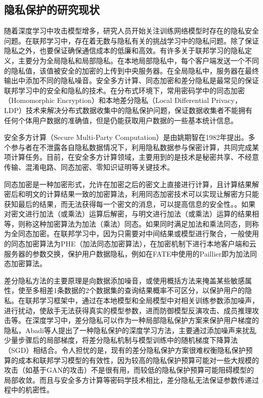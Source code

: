 \subsection{隐私保护的研究现状}
随着深度学习中攻击模型增多，研究人员开始关注训练网络模型时存在的隐私安全问题。在联邦学习中，存在着无数与隐私有关的挑战学习中的隐私问题。除了保证隐私之外，也要保证确保通信成本的低廉和高效。有许多关于联邦学习的隐私定义，主要分为全局隐私和局部隐私。在本地局部隐私中，每个客户端发送一个不同的隐私值，该值被安全的加密的上传到中央服务器。在全局隐私中，服务器在最终输出中添加不同的隐私噪音。安全多方计算、同态加密和差分隐私是最常见的保证联邦学习中的安全和隐私的技术。在分布式环境下，常用密码学中的同态加密（Homomorphic Encryption）和本地差分隐私（Local Differential Privacy， LDP）技术来解决分布式数据收集中的隐私保护问题，保证数据收集者不能拥有任何个体用户数据的准确值，但是仍能获取用户数据的一些基本统计信息。

安全多方计算（Secure Multi-Party Computation）是由姚期智在1982年提出。多个参与者在不泄露各自隐私数据情况下，利用隐私数据参与保密计算，共同完成某项计算任务。目前，在安全多方计算领域，主要用到的是技术是秘密共享、不经意传输、混淆电路、同态加密、零知识证明等关键技术。

同态加密是一种加密形式，允许在加密之后的密文上直接进行计算，且计算结果解密后和明文的计算结果一致的加密算法，利用同态加密技术可以实现让解密方只能获知最后的结果，而无法获得每一个密文的消息，可以提高信息的安全性。。如果对密文进行加法（或乘法）运算后解密，与明文进行加法（或乘法）运算的结果相等，则称这种加密算法为加法（乘法）同态。如果同时满足加法和乘法同态，则称为全同态加密。在联邦学习中，因为只需要对中间结果或模型进行聚合，一般使用的同态加密算法为PHE（加法同态加密算法），在加密机制下进行本地客户端和云服务器的参数交换，保护用户数据隐私，例如在FATE中使用的Paillier即为加法同态加密算法。

差分隐私方法的主要原理是向数据添加噪音，或使用概括方法来掩盖某些敏感属性，使至多相差1条数据的2个数据集的查询结果概率不可区分，以保护用户的隐私。在联邦学习框架中，通过在本地模型和全局模型中对相关训练参数添加噪声，进行扰动，使敌手无法获得真实的模型参数，进而防御模型反演攻击、成员推理攻击等。在深度学习中，差分隐私可以作为一种局部隐私保护方案来保护用户梯度的隐私，Abadi等人提出了一种隐私保护的深度学习方法，主要通过添加噪声来扰乱少量步骤后的局部梯度，将差分隐私机制与模型训练中的随机梯度下降算法（SGD）相结合。令人担忧的是，现有的差分隐私保护方案很难权衡隐私保护预算的成本和联邦学习模型的有效性，因为较高的隐私保护预算可能对一些大规模的攻击（如基于GAN的攻击）不是很有用，而较低的隐私保护预算可能阻碍模型的局部收敛。而且与安全多方计算等密码学技术相比，差分隐私无法保证参数传递过程中的机密性。

